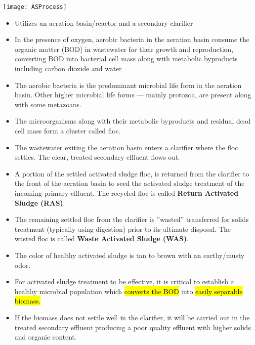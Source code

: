\begin{center}
\texttt{[image: ASProcess]}
\end{center}
\begin{itemize}

\item Utilizes an aeration basin/reactor and a secondary clarifier

\item In the presence of oxygen, aerobic bacteria in the aeration basin consume the organic matter (BOD) in wastewater for their growth and reproduction, converting BOD into bacterial cell mass along with metabolic byproducts including carbon dioxide and water

\item The aerobic bacteria is the predominant microbial life form in the aeration basin.  Other higher microbial life forms — mainly protozoa, are present along with some metazoans.

\item The microorganisms along with their metabolic byproducts and residual dead cell mass form a cluster called floc.

\item The wastewater exiting the aeration basin enters a clarifier where the floc settles.  The clear, treated secondary effluent flows out.

\item A portion of the settled activated sludge floc, is returned from the clarifier to the front of the aeration basin to seed the activated sludge treatment of the incoming primary effluent. The recycled floc is called \textbf{Return Activated Sludge (RAS)}.

\item The remaining settled floc from the clarifier is ”wasted” \textemdash transferred for solids treatment (typically using digestion) prior to its ultimate disposal. The wasted floc is called \textbf{Waste Activated Sludge (WAS)}.

\item The color of healthy activated sludge is tan to brown with an earthy/musty odor.

\item For activated sludge treatment to be effective, it is critical to establish a healthy microbial population which \hl{converts the BOD} into \hl{easily separable biomass.}
\item If the biomass does not settle well in the clarifier, it will be carried out in the treated secondary effluent producing a poor quality effluent with higher solids and organic content.  \\
\end{itemize}


